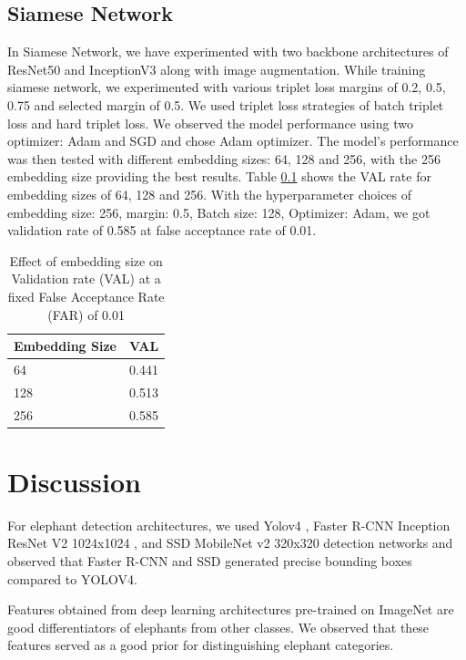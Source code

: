 \documentclass[10pt,twocolumn,letterpaper]{article}
\begin{document}
\subsection{Siamese Network}

In Siamese Network, we have  experimented with two backbone architectures of ResNet50 and InceptionV3 along with image augmentation. While training siamese network, we experimented with various triplet loss margins of 0.2, 0.5, 0.75 and selected margin of 0.5. We used triplet loss strategies of batch triplet loss and hard triplet loss. We observed the model performance using two optimizer: Adam and SGD and chose Adam optimizer. The model's performance was then tested with different embedding sizes: 64, 128 and 256, with the 256 embedding size providing the best results. Table \ref{} shows the VAL rate for embedding sizes of 64, 128 and 256. With the hyperparameter choices of embedding size: 256, margin: 0.5, Batch size: 128, Optimizer: Adam, we got validation rate of 0.585 at false acceptance rate of 0.01. 



\begin{table}[]
\begin{tabular}{@{}l|l@{}}
Embedding Size & VAL   \\ \midrule
64             & 0.441 \\
128            & 0.513 \\
256            & 0.585
\end{tabular}
\caption{Effect of embedding size on Validation rate (VAL) at a fixed False Acceptance Rate (FAR) of 0.01}
\label{tab:embedding-size-val}
\end{table}


\section{Discussion}
\label{sec:discussion}

For elephant detection architectures, we used Yolov4 \cite{yolov4}, Faster R-CNN Inception ResNet V2 1024x1024 \cite{fasterrcnn}, and SSD MobileNet v2 320x320 detection networks and observed that Faster R-CNN and SSD generated precise bounding boxes compared to YOLOV4.

Features obtained from deep learning architectures pre-trained on ImageNet are good differentiators of elephants from other classes. We observed that these features served as a good prior for distinguishing elephant categories. 
\end{document}
